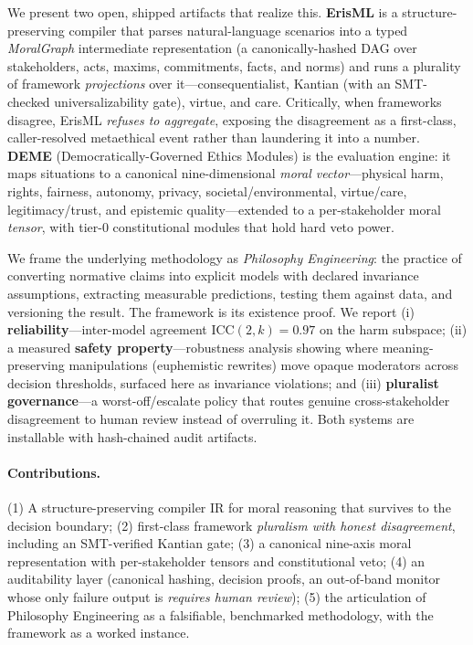 We present two open, shipped artifacts that realize this. \textbf{ErisML} is a
structure-preserving compiler that parses natural-language scenarios into a typed
\emph{MoralGraph} intermediate representation (a canonically-hashed DAG over stakeholders,
acts, maxims, commitments, facts, and norms) and runs a plurality of framework
\emph{projections} over it---consequentialist, Kantian (with an SMT-checked
universalizability gate), virtue, and care. Critically, when frameworks disagree, ErisML
\emph{refuses to aggregate}, exposing the disagreement as a first-class, caller-resolved
metaethical event rather than laundering it into a number. \textbf{DEME}
(Democratically-Governed Ethics Modules) is the evaluation engine: it maps situations to a
canonical nine-dimensional \emph{moral vector}---physical harm, rights, fairness, autonomy,
privacy, societal/environmental, virtue/care, legitimacy/trust, and epistemic
quality---extended to a per-stakeholder moral \emph{tensor}, with tier-0 constitutional
modules that hold hard veto power.

We frame the underlying methodology as \emph{Philosophy Engineering}: the practice of
converting normative claims into explicit models with declared invariance assumptions,
extracting measurable predictions, testing them against data, and versioning the result.
The framework is its existence proof. We report (i) \textbf{reliability}---inter-model
agreement ICC$(2,k)=0.97$ on the harm subspace; (ii) a measured \textbf{safety
property}---robustness analysis showing where meaning-preserving manipulations
(euphemistic rewrites) move opaque moderators across decision thresholds, surfaced here as
invariance violations; and (iii) \textbf{pluralist governance}---a worst-off/escalate
policy that routes genuine cross-stakeholder disagreement to human review instead of
overruling it. Both systems are installable with hash-chained audit artifacts.

\paragraph{Contributions.}
(1) A structure-preserving compiler IR for moral reasoning that survives to the decision
boundary; (2) first-class framework \emph{pluralism with honest disagreement}, including an
SMT-verified Kantian gate; (3) a canonical nine-axis moral representation with
per-stakeholder tensors and constitutional veto; (4) an auditability layer (canonical
hashing, decision proofs, an out-of-band monitor whose only failure output is
\emph{requires human review}); (5) the articulation of Philosophy Engineering as a
falsifiable, benchmarked methodology, with the framework as a worked instance.

